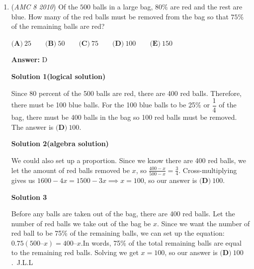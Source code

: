 \begin{enumerate}
$s + 16 = t$
$3t = 4s$

 Solving by substitution,$\frac{3}{4}t + 16 = t$
$16 = \frac{1}{4}t$
$t=\boxed{\textbf{(B)}\ 64}$




\textbf{Solution 4 (ANOTHER ALGEBRA ONE)}

Assume the ratio is represented through $x$. Then, $4x=3x+16$, meaning $x=16$. Plug back into $4x$ to get $t=\boxed{\textbf{(B)}\ 64}$

 -N.

 


 


 


 


	\item (\textit{AMC 8 2010}) Of the $500$ balls in a large bag, $80\%$ are red and the rest are blue. How many of the red balls must be removed from the bag so that $75\%$ of the remaining balls are red?


 $\textbf{(A)}\ 25 \qquad\textbf{(B)}\ 50 \qquad\textbf{(C)}\ 75 \qquad\textbf{(D)}\ 100\qquad\textbf{(E)}\ 150$

 \textbf{Answer: }D



\textbf{Solution 1(logical solution)}

Since 80 percent of the 500 balls are red, there are 400 red balls. Therefore, there must be 100 blue balls. For the 100 blue balls to be 25\% or $\dfrac{1}{4}$ of the bag, there must be 400 balls in the bag so 100 red balls must be removed. The answer is $\boxed{\textbf{(D)}\ 100}$.

 



\textbf{Solution 2(algebra solution)}

We could also set up a proportion. Since we know there are 400 red balls, we let the amount of red balls removed be $x$, so $\frac{400-x}{500-x}=\frac{3}{4}$. Cross-multiplying gives us $1600-4x=1500-3x \implies x=100$, so our answer is $\boxed{\textbf{(D)}\ 100}$.

 



\textbf{Solution 3}

Before any balls are taken out of the bag, there are 400 red balls. Let the number of red balls we take out of the bag be $x$. Since we want the number of red ball to be 75\% of the remaining balls, we can set up the equation: $0.75(500–x)=400–x$.In words, 75\% of the total remaining balls are equal to the remaining red balls. Solving we get $x=100$, so our answer is $\boxed{\textbf{(D)}\ 100}$.~J.L.L


\end{enumerate}
